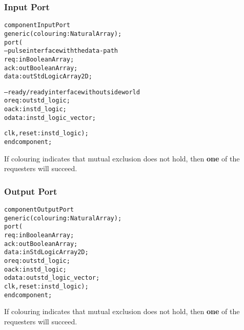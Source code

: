 \documentclass{beamer}
\begin{document}

\begin{frame}[fragile]
  \frametitle{Input Port}
\begin{alltt}
component InputPort
  generic (colouring: NaturalArray);
  port (
    -- pulse interface with the data-path
    req       : in  BooleanArray;
    ack       : out BooleanArray;
    data      : out StdLogicArray2D;
    
    -- ready/ready interface with outside world
    oreq       : out std_logic;
    oack       : in  std_logic;
    odata      : in  std_logic_vector;
    
    clk, reset : in  std_logic);
end component;
\end{alltt}
If colouring indicates that mutual 
exclusion does not hold, then {\bf one} of the requesters
will succeed.
\end{frame}

\begin{frame}[fragile]
  \frametitle{Output Port}
\begin{alltt}
component OutputPort
  generic (colouring: NaturalArray);
  port (
    req       : in  BooleanArray;
    ack       : out BooleanArray;
    data      : in  StdLogicArray2D;
    oreq       : out std_logic;
    oack       : in  std_logic;
    odata      : out std_logic_vector;
    clk, reset : in  std_logic);
end component;
\end{alltt}
If colouring indicates that mutual 
exclusion does not hold, then {\bf one} of the requesters
will succeed.
\end{frame}
\end{document}
